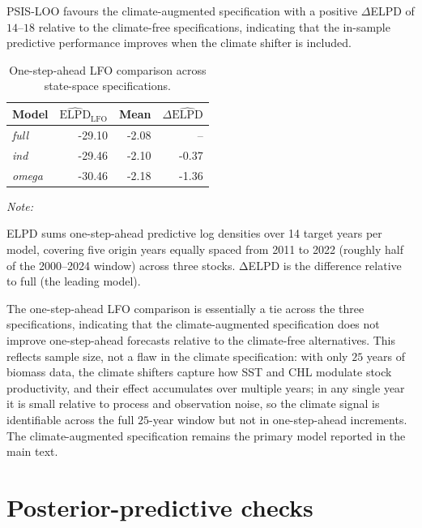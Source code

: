 \documentclass[
  11pt,
]{article}
\begin{document}
PSIS-LOO favours the climate-augmented specification with a positive
\(\Delta\)ELPD of \(14\)--\(18\) relative to the climate-free specifications,
indicating that the in-sample predictive performance improves when the
climate shifter is included.

\begin{table}[!h]
\centering
\caption{\label{tab:lfo-appendix-table}One-step-ahead LFO comparison across state-space specifications. \label{tab:lfo-appendix}}
\centering
\fontsize{10}{12}\selectfont
\begin{threeparttable}
\begin{tabular}[t]{lrrr}
\toprule
Model & $\widehat{\text{ELPD}}_{\text{LFO}}$ & Mean & $\Delta\widehat{\text{ELPD}}$\\
\midrule
\emph{full} & -29.10 & -2.08 & --\\
\emph{ind} & -29.46 & -2.10 & -0.37\\
\emph{omega} & -30.46 & -2.18 & -1.36\\
\bottomrule
\end{tabular}
\begin{tablenotes}
\item \textit{Note:} 
\item ELPD sums one-step-ahead predictive log densities over 14 target years per model, covering five origin years equally spaced from 2011 to 2022 (roughly half of the 2000--2024 window) across three stocks. ΔELPD is the difference relative to full (the leading model).
\end{tablenotes}
\end{threeparttable}
\end{table}

The one-step-ahead LFO comparison is essentially a tie across the three
specifications, indicating that the climate-augmented specification
does not improve one-step-ahead forecasts relative to the climate-free
alternatives. This reflects sample size, not a flaw in the climate
specification: with only \(25\) years of biomass data, the climate
shifters capture how SST and CHL modulate stock productivity, and
their effect accumulates over multiple years; in any single year it
is small relative to process and observation noise, so the climate
signal is identifiable across the full \(25\)-year window but not in
one-step-ahead increments. The climate-augmented specification remains the primary
model reported in the main text.

\section{Posterior-predictive checks}\label{appendix-posterior}
\end{document}
